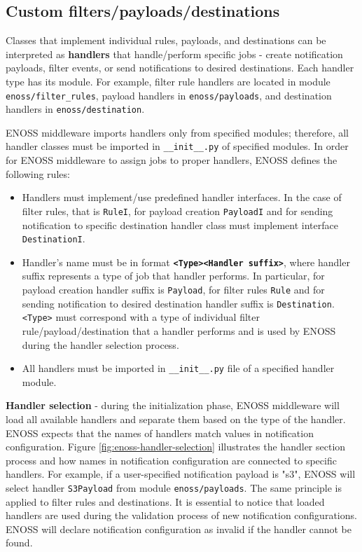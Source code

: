     \subsection{Custom filters/payloads/destinations}

    Classes that implement individual rules, payloads, and destinations can be interpreted as \textbf{handlers} that handle/perform specific jobs - create notification payloads, filter events, or send notifications to desired destinations. Each handler type has its module. For example, filter rule handlers are located in module \texttt{enoss/filter\_rules}, payload handlers in \texttt{enoss/payloads}, and destination handlers in \texttt{enoss/destination}.

    ENOSS middleware imports handlers only from specified modules; therefore, all handler classes must be imported in \texttt{\_\_init\_\_.py} of specified modules. In order for ENOSS middleware to assign jobs to proper handlers, ENOSS defines the following rules:
    \begin{itemize}
        \item Handlers must implement/use predefined handler interfaces. In the case of filter rules, that is \texttt{RuleI}, for payload creation \texttt{PayloadI} and for sending notification to specific destination handler class must implement interface \texttt{DestinationI}.
        \item Handler's name must be in format \textbf{\texttt{<Type><Handler suffix>}}, where handler suffix represents a type of job that handler performs. In particular, for payload creation handler suffix is \texttt{Payload}, for filter rules \texttt{Rule} and for sending notification to desired destination handler suffix is \texttt{Destination}. \texttt{<Type>} must correspond with a type of individual filter rule/payload/destination that a handler performs and is used by ENOSS during the handler selection process.
        \item All handlers must be imported in \texttt{\_\_init\_\_.py} file of a specified handler module.
    \end{itemize}

    \textbf{Handler selection} - during the initialization phase, ENOSS middleware will load all available handlers and separate them based on the type of the handler. ENOSS expects that the names of handlers match values in notification configuration. Figure \ref{fig:enoss-handler-selection} illustrates the handler section process and how names in notification configuration are connected to specific handlers. For example,  if a user-specified notification payload is "s3", ENOSS will select handler \texttt{S3Payload} from module \texttt{enoss/payloads}. The same principle is applied to filter rules and destinations. It is essential to notice that loaded handlers are used during the validation process of new notification configurations. ENOSS will declare notification configuration as invalid if the handler cannot be found.

